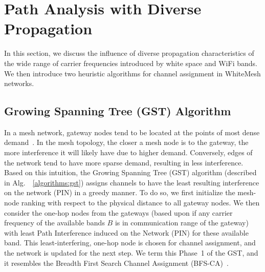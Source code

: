 \section{Path Analysis with Diverse Propagation}
\label{sec:wmalgorithms}


In this section, we discuss the influence of diverse propagation
characteristics of the wide range of carrier frequencies introduced
by white space and WiFi bands. We then introduce two heuristic
algorithms for channel assignment in WhiteMesh networks.




\subsection{Growing Spanning Tree (GST) Algorithm}

In a mesh network, gateway nodes tend to be located at the points
of most dense demand~\cite{robinson2008adding, he2008optimizing}.
In the mesh topology, the closer a mesh node is to the gateway, 
the more interference it will likely have due to higher demand.
Conversely, edges of the network tend to have more sparse demand,
resulting in less interference. Based on this intuition, 
the Growing Spanning Tree (GST) algorithm (described in Alg.~~\ref{algorithms:gst}) 
assigns channels to have the least resulting interference on the network (PIN) in a 
greedy manner. To do so, we first initialize the mesh-node ranking 
with respect to the physical distance to all gateway nodes.
We then consider the one-hop nodes from the gateways (based upon
if any carrier frequency of the available bands $B$ is in 
communication range of the gateway) with least Path Interference
induced on the Network (PIN) for these available band. This 
least-interfering, one-hop node is chosen for channel assignment,
and the network is updated for the next step. We term this Phase~1
of the GST, and it resembles the Breadth First Search Channel
Assignment (BFS-CA)~\cite{ramachandran2006interference}.

